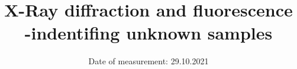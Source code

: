 

\subject{\vspace{-4cm}Labreport 2}  %
\title{\vspace{-0.5cm}X-Ray diffraction and fluorescence -indentifing unknown samples} %
\date{\vspace{-0.5cm}
 Date of measurement: 29.10.2021  %
}




\twocolumn[
\maketitle
\begin{onecolabstract}
  
\end{onecolabstract}
]






\printbibliography{}


